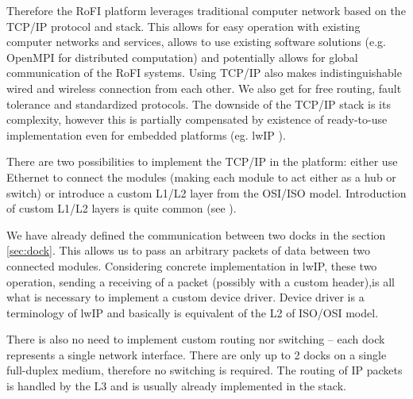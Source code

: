 Therefore the RoFI platform leverages traditional computer network based on the
TCP/IP protocol and stack. This allows for easy operation with existing computer
networks and services, allows to use existing software solutions (e.g. OpenMPI
for distributed computation) and potentially allows for global communication of
the RoFI systems. Using TCP/IP also makes indistinguishable wired and wireless
connection from each other. We also get for free routing, fault tolerance and
standardized protocols. The downside of the TCP/IP stack is its complexity,
however this is partially compensated by existence of ready-to-use
implementation even for embedded platforms (eg. lwIP ).

There are two possibilities to implement the TCP/IP in the platform: either use
Ethernet to connect the modules (making each module to act either as a hub or
switch) or introduce a custom L1/L2 layer from the OSI/ISO
model\cite{braden_requirements_1989}. Introduction of custom L1/L2 layers is
quite common (see \cite{waitzman_ip_1999}).

We have already defined the communication between two docks in the section
\ref{sec:dock}. This allows us to pass an arbitrary packets of data between two
connected modules. Considering concrete implementation in lwIP, these two
operation, sending a receiving of a packet (possibly with a custom header),is
all what is necessary to implement a custom device driver. Device driver is a
terminology of lwIP and basically is equivalent of the L2 of ISO/OSI model.

There is also no need to implement custom routing nor switching -- each dock
represents a single network interface. There are only up to 2 docks on a single
full-duplex medium, therefore no switching is required. The routing of IP
packets is handled by the L3 and is usually already implemented in the stack.
